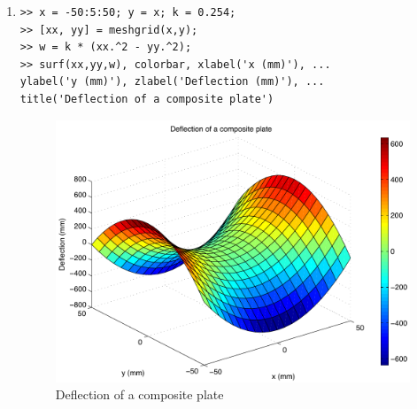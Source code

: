 \begin{enumerate}
\clearpage
\item
\begin{lstlisting}
>> x = -50:5:50; y = x; k = 0.254;
>> [xx, yy] = meshgrid(x,y);
>> w = k * (xx.^2 - yy.^2);
>> surf(xx,yy,w), colorbar, xlabel('x (mm)'), ...
ylabel('y (mm)'), zlabel('Deflection (mm)'), ...
title('Deflection of a composite plate')
\end{lstlisting}
\begin{figure}[h]
	\myfloatalign
	\includegraphics[width=\linewidth]{Graphics/Additional-Ex/3D-plate-deflection-plot}
	\caption{Deflection of a composite plate}
	\label{fig:3D-plate-deflection-plot}
\end{figure}


\end{enumerate}
